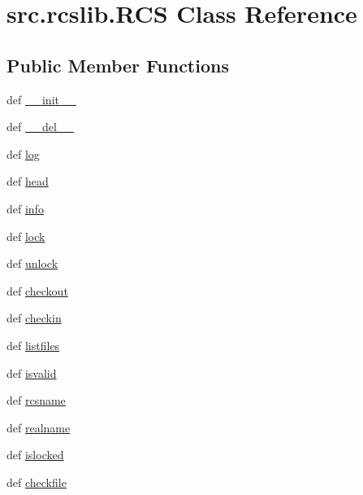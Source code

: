 \hypertarget{classsrc_1_1rcslib_1_1_r_c_s}{\section{src.\-rcslib.\-R\-C\-S Class Reference}
\label{classsrc_1_1rcslib_1_1_r_c_s}
}
\subsection*{Public Member Functions}
\begin{DoxyCompactItemize}
\item 
def \hyperlink{classsrc_1_1rcslib_1_1_r_c_s_af6d3f83ff6e44adfd44ba8dae37e65c4}{\-\_\-\-\_\-init\-\_\-\-\_\-}
\item 
def \hyperlink{classsrc_1_1rcslib_1_1_r_c_s_a9bfcc8c2d943fa305ddc4f97cf54e6a9}{\-\_\-\-\_\-del\-\_\-\-\_\-}
\item 
def \hyperlink{classsrc_1_1rcslib_1_1_r_c_s_a907e8db00fe010cad8fa0f20173f9b9a}{log}
\item 
def \hyperlink{classsrc_1_1rcslib_1_1_r_c_s_a984a594621aacbf75eaab80bbbe61eb6}{head}
\item 
def \hyperlink{classsrc_1_1rcslib_1_1_r_c_s_a8e83cec89e260b48c055406b9345438a}{info}
\item 
def \hyperlink{classsrc_1_1rcslib_1_1_r_c_s_a70fe29b9b6df38d982c90c9f966db453}{lock}
\item 
def \hyperlink{classsrc_1_1rcslib_1_1_r_c_s_a5682c4e36636c6d5fa260c2fdc7b94a2}{unlock}
\item 
def \hyperlink{classsrc_1_1rcslib_1_1_r_c_s_a4d90840fd169eb50f41cb66acc6e672a}{checkout}
\item 
def \hyperlink{classsrc_1_1rcslib_1_1_r_c_s_ad3a4f70c5fbe84a0e42ca943428f55d2}{checkin}
\item 
def \hyperlink{classsrc_1_1rcslib_1_1_r_c_s_ad7ddfde96181fc65b61fa2cc8df7acb8}{listfiles}
\item 
def \hyperlink{classsrc_1_1rcslib_1_1_r_c_s_af22029df600c226a8462bc6228621265}{isvalid}
\item 
def \hyperlink{classsrc_1_1rcslib_1_1_r_c_s_a2c31aea9df8c203cf687cf8dbbb23075}{rcsname}
\item 
def \hyperlink{classsrc_1_1rcslib_1_1_r_c_s_a7fecb235e4ecd26ff89000fde665000e}{realname}
\item 
def \hyperlink{classsrc_1_1rcslib_1_1_r_c_s_a5f6f4c966126cb67ac9d82be61af3afc}{islocked}
\item 
def \hyperlink{classsrc_1_1rcslib_1_1_r_c_s_aba91cf3ead7caee48101e0fcd0af908b}{checkfile}
\end{DoxyCompactItemize}
